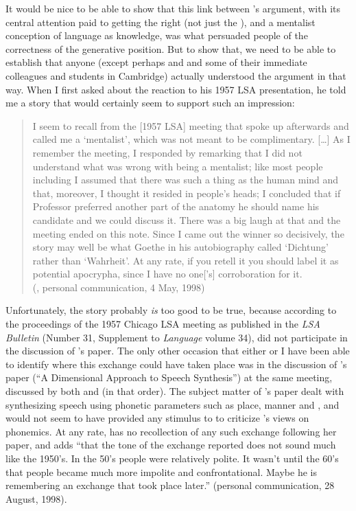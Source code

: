 It would be  nice to be able to show that this link between
{\Halle}'s argument, with its central attention paid to getting the 
right (not just the ), and a mentalist conception of
language as knowledge, was what persuaded people of the correctness of
the generative position. But to show that, we need to be able to
establish that anyone (except perhaps {\Chomsky} and {\Halle} and some of
their immediate colleagues and students in Cambridge) actually
understood the argument in that way.  When I first asked 
about the reaction to his 1957 LSA presentation, he told me a story
that would certainly seem to support such an impression:
  
\begin{quotation}
  I seem to recall
  from the {[1957 LSA]} meeting that {\Bloch} spoke up afterwards and
  called me a `mentalist', which was not meant to be complimentary.
  {[\ldots]} As I remember the meeting, I responded by remarking that
  I did not understand what was wrong with being a mentalist; like
  most people including {\Bloch} I assumed that there was such a thing as
  the human mind and that, moreover, I thought it resided in people's
  heads; I concluded that if Professor {\Bloch} preferred another part of
  the anatomy he should name his candidate and we could discuss it.
  There was a big laugh at that and the meeting ended on this note.
  Since I came out the winner so decisively, the story may well be
  what Goethe in his autobiography called `Dichtung' rather than
  `Wahrheit'.  At any rate, if you retell it you should label it as
  potential apocrypha, since I have no one['s] corroboration for it.\\
  ({\Halle}, personal communication, 4 May, 1998)
\end{quotation}
  
Unfortunately, the story probably \emph{is} too good to be true, because
according to the proceedings of the 1957 Chicago LSA meeting as
published in the \textsl{LSA Bulletin} (Number 31, Supplement to
\textsl{Language} volume 34), {\Bloch} did not participate in the
discussion of {\Halle}'s paper. The only other occasion that either {\Halle}
or I have been able to identify where this exchange could have taken
place was in the discussion of 's paper (``A
Dimensional Approach to Speech Synthesis'') at the same meeting,
discussed by both {\Bloch} and {\Halle} (in that order). The subject matter
of {\Ingemann}'s paper dealt with synthesizing speech using phonetic
parameters such as place, manner and , and would not seem to
have provided any stimulus to {\Bloch} to criticize {\Halle}'s views on
phonemics. At any rate, {\Ingemann} has no recollection of any such
exchange following her paper, and adds ``that the tone of the exchange
{\Halle} reported does not sound much like the 1950's.  In the 50's
people were relatively polite.  It wasn't until the 60's that people
became much more impolite and confrontational.  Maybe he is
remembering an exchange that took place later.'' (personal
communication, 28 August, 1998).

